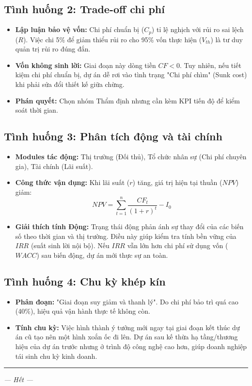 \subsection{Tình huống 2: Trade-off chi phí}
\begin{itemize}
    \item \textbf{Lập luận bảo vệ vốn:} Chi phí chuẩn bị ($C_p$) tỉ lệ nghịch với rủi ro sai lệch ($R$). Việc chi 5\% để giảm thiểu rủi ro cho 95\% vốn thực hiện ($V_{th}$) là tư duy quản trị rủi ro đúng đắn.
    \item \textbf{Vốn không sinh lời:} Giai đoạn này dòng tiền $CF < 0$. Tuy nhiên, nếu tiết kiệm chi phí chuẩn bị, dự án dễ rơi vào tình trạng "Chi phí chìm" (Sunk cost) khi phải sửa đổi thiết kế giữa chừng.
    \item \textbf{Phán quyết:} Chọn nhóm Thẩm định nhưng cần kèm KPI tiến độ để kiểm soát thời gian.
\end{itemize}

\subsection{Tình huống 3: Phân tích động và tài chính}
\begin{itemize}
    \item \textbf{Modules tác động:} Thị trường (Đối thủ), Tổ chức nhân sự (Chi phí chuyên gia), Tài chính (Lãi suất).
    \item \textbf{Công thức vận dụng:} Khi lãi suất ($r$) tăng, giá trị hiện tại thuần ($NPV$) giảm:
    \[ NPV = \sum_{t=1}^{n} \frac{CF_t}{(1+r)^t} - I_0 \]
    \item \textbf{Giải thích tính Động:} Trạng thái động phản ánh sự thay đổi của các biến số theo thời gian và thị trường. Điều này giúp kiểm tra tính bền vững của $IRR$ (suất sinh lời nội bộ). Nếu $IRR$ vẫn lớn hơn chi phí sử dụng vốn ($WACC$) sau biến động, dự án mới thực sự an toàn.
\end{itemize}

\subsection{Tình huống 4: Chu kỳ khép kín}
\begin{itemize}
    \item \textbf{Phân đoạn:} "Giai đoạn suy giảm và thanh lý". Do chi phí bảo trì quá cao (40\%), hiệu quả vận hành thực tế không còn.
    \item \textbf{Tính chu kỳ:} Việc hình thành ý tưởng mới ngay tại giai đoạn kết thúc dự án cũ tạo nên một hình xoắn ốc đi lên. Dự án sau kế thừa hạ tầng/thương hiệu của dự án trước nhưng ở trình độ công nghệ cao hơn, giúp doanh nghiệp tái sinh chu kỳ kinh doanh.
\end{itemize}

\rule{\textwidth}{1pt}

\begin{center}
\textit{--- Hết ---}
\end{center}

